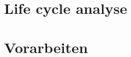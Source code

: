 \documentclass[a4paper, 11pt, fleqn]{article}
\begin{document}
	\begin{titlepage}
	\titleGM
	\thispagestyle{empty}
	\end{titlepage}
	\section{Life cycle analyse}
	\tableofcontents	
 	\clearpage
	
	\clearpage
	
	\clearpage
	
	\clearpage
	
	\clearpage
	\section{Vorarbeiten}
	
	\clearpage
	
	\clearpage
	\listoffigures
    \nocite{*}
    
    
\end{document}
